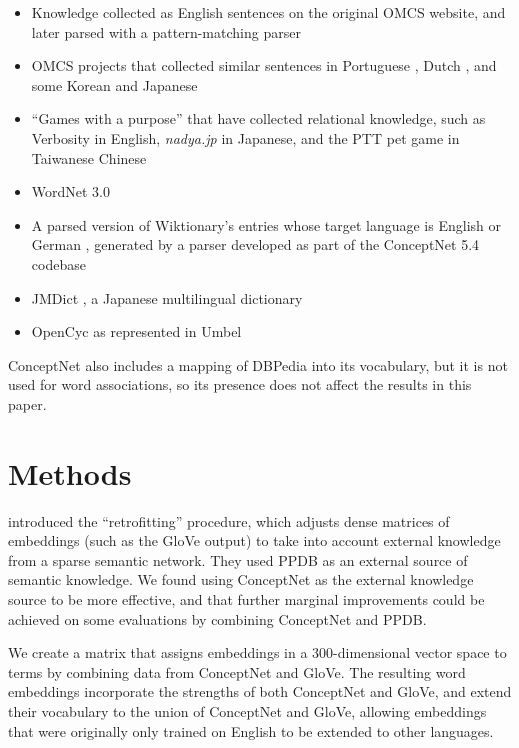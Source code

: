 \documentclass[11pt]{article}
\begin{document}
\begin{itemize}
\item Knowledge collected as English sentences on the original OMCS website,
    and later parsed with a pattern-matching parser
\item OMCS projects that collected similar sentences in Portuguese
    \cite{anacleto2006portuguese},
    Dutch \cite{eckhardt2008kid}, and some Korean and Japanese
    \cite{chung2006globalmind}
\item ``Games with a purpose'' that have collected relational knowledge, such as
    Verbosity \cite{vonahn2006verbosity} in English, {\em nadya.jp}
    \cite{nakahara2011nadya} in Japanese, and the PTT pet game \cite{kuo2009petgame}
    in Taiwanese Chinese
\item WordNet 3.0 \cite{miller1998wordnet}
\item A parsed version of Wiktionary's entries whose target language is English or
      German \cite{wiktionary2014en} \cite{wiktionary2014de}, generated
      by a parser developed as part of the ConceptNet 5.4 codebase
\item JMDict \cite{breen2004jmdict}, a Japanese multilingual dictionary
\item OpenCyc \cite{matuszek2006cyc} as represented in Umbel \cite{bergman2008umbel}
\end{itemize}

ConceptNet also includes a mapping of DBPedia \cite{auer2007dbpedia} into
its vocabulary, but it is not used for word associations, so its presence does
not affect the results in this paper.

\section{Methods}

 introduced the ``retrofitting'' procedure,
which adjusts dense matrices of embeddings (such as the GloVe output) to take
into account external knowledge from a sparse semantic network. They used PPDB
\cite{ganitkevitch2013ppdb} as an external source of semantic knowledge. We
found using ConceptNet as the external knowledge source to be more effective,
and that further marginal improvements could be achieved on some evaluations by
combining ConceptNet and PPDB.

We create a matrix that assigns embeddings in a 300-dimensional vector
space to terms by combining data from ConceptNet and GloVe. The resulting word
embeddings incorporate the strengths of both ConceptNet and GloVe, and extend
their vocabulary to the union of ConceptNet and GloVe, allowing embeddings that
were originally only trained on English to be extended to other languages.
\end{document}
